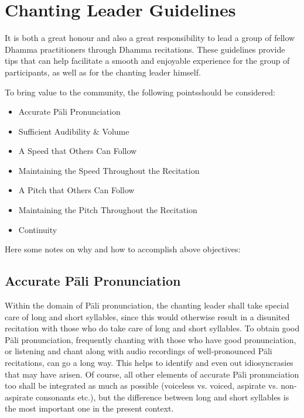 \section{Chanting Leader Guidelines}

\begin{justify}
  It is both a great honour and also a great responsibility to lead a group of fellow Dhamma practitioners through Dhamma recitations. These guidelines provide tips that can help facilitate a smooth and enjoyable experience for the group of participants, as well as for the chanting leader himself.
\end{justify}

To bring value to the community, the following pointsshould be considered:
\begin{itemize}
  \item Accurate Pāli Pronunciation
  \item Sufficient Audibility \& Volume
  \item A Speed that Others Can Follow
  \item Maintaining the Speed Throughout the Recitation
  \item A Pitch that Others Can Follow
  \item Maintaining the Pitch Throughout the Recitation
  \item Continuity
\end{itemize}
Here some notes on why and how to accomplish above objectives:

\subsection*{Accurate Pāli Pronunciation}
\begin{justify}
  Within the domain of Pāli pronunciation, the chanting leader shall take special care of long and short syllables, since this would otherwise result in a disunited recitation with those who do take care of long and short syllables. To obtain good Pāli pronunciation, frequently chanting with those who have good pronunciation, or listening and chant along with audio recordings of well-pronounced Pāli recitations, can go a long way. This helps to identify and even out idiosyncrasies that may have arisen. Of course, all other elements of accurate Pāli pronunciation too shall be integrated as much as possible (voiceless vs. voiced, aspirate vs. non-aspirate consonants etc.), but the difference between long and short syllables is the most important one in the present context.
\end{justify}

